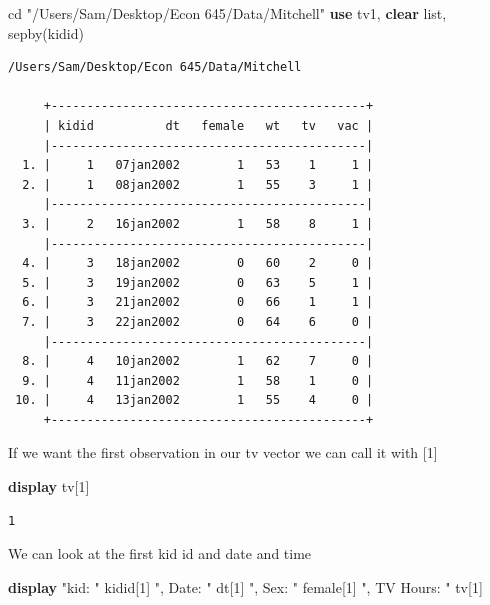 \documentclass[
]{book}
\newenvironment{Shaded}{\begin{snugshade}}{\end{snugshade}}
\newcommand{\KeywordTok}[1]{\textcolor[rgb]{0.13,0.29,0.53}{\textbf{#1}}}
\newcommand{\NormalTok}[1]{#1}
\newcommand{\OtherTok}[1]{\textcolor[rgb]{0.56,0.35,0.01}{#1}}
\newcommand{\StringTok}[1]{\textcolor[rgb]{0.31,0.60,0.02}{#1}}
\begin{document}
\begin{Shaded}
\begin{Highlighting}[]
\NormalTok{cd }\StringTok{"/Users/Sam/Desktop/Econ 645/Data/Mitchell"}
\KeywordTok{use}\NormalTok{ tv1, }\KeywordTok{clear}
\OtherTok{list}\NormalTok{, sepby(kidid)}
\end{Highlighting}
\end{Shaded}

\begin{verbatim}
/Users/Sam/Desktop/Econ 645/Data/Mitchell

     +--------------------------------------------+
     | kidid          dt   female   wt   tv   vac |
     |--------------------------------------------|
  1. |     1   07jan2002        1   53    1     1 |
  2. |     1   08jan2002        1   55    3     1 |
     |--------------------------------------------|
  3. |     2   16jan2002        1   58    8     1 |
     |--------------------------------------------|
  4. |     3   18jan2002        0   60    2     0 |
  5. |     3   19jan2002        0   63    5     1 |
  6. |     3   21jan2002        0   66    1     1 |
  7. |     3   22jan2002        0   64    6     0 |
     |--------------------------------------------|
  8. |     4   10jan2002        1   62    7     0 |
  9. |     4   11jan2002        1   58    1     0 |
 10. |     4   13jan2002        1   55    4     0 |
     +--------------------------------------------+
\end{verbatim}

If we want the first observation in our tv vector we can call it with {[}1{]}

\begin{Shaded}
\begin{Highlighting}[]
\KeywordTok{display}\NormalTok{ tv[1]}
\end{Highlighting}
\end{Shaded}

\begin{verbatim}
1
\end{verbatim}

We can look at the first kid id and date and time

\begin{Shaded}
\begin{Highlighting}[]
\KeywordTok{display} \StringTok{"kid: "}\NormalTok{ kidid[1] }\StringTok{", Date: "}\NormalTok{ dt[1] }\StringTok{", Sex: "}\NormalTok{ female[1] }\StringTok{", TV Hours: "}\NormalTok{ tv[1]}
\end{Highlighting}
\end{Shaded}
\end{document}
